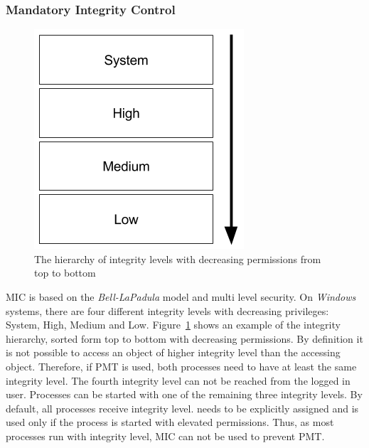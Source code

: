 \subsubsection{Mandatory Integrity Control}
\label{sec:mic}
\begin{figure}[h]
\centering
\includegraphics[scale=0.5]{sections/background/defenses/mic.png}
\caption{The hierarchy of integrity levels with decreasing permissions from top to bottom}
\label{fig:mic}
\end{figure}
\gls{MIC} is based on the \emph{Bell-LaPadula} \cite{eckert2014sicherheit} model and multi level security. On \emph{Windows} systems, there are four different integrity levels with decreasing privileges: System, High, Medium and Low. Figure~\ref{fig:mic} shows an example of the integrity hierarchy, sorted form top to bottom with decreasing permissions. By definition it is not possible to access an object of higher integrity level than the accessing object. Therefore, if \gls{PMT} is used, both processes need to have at least the same integrity level. The fourth integrity level  can not be reached from the logged in user. Processes can be started with one of the remaining three integrity levels. By default, all processes receive  integrity level.  needs to be explicitly assigned and  is used only if the process is started with elevated permissions. Thus, as most processes run with  integrity level, \gls{MIC} can not be used to prevent \gls{PMT}.